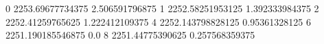 0 2253.69677734375 2.506591796875
1 2252.58251953125 1.392333984375
2 2252.41259765625 1.222412109375
4 2252.143798828125 0.95361328125
6 2251.190185546875 0.0
8 2251.44775390625 0.257568359375

